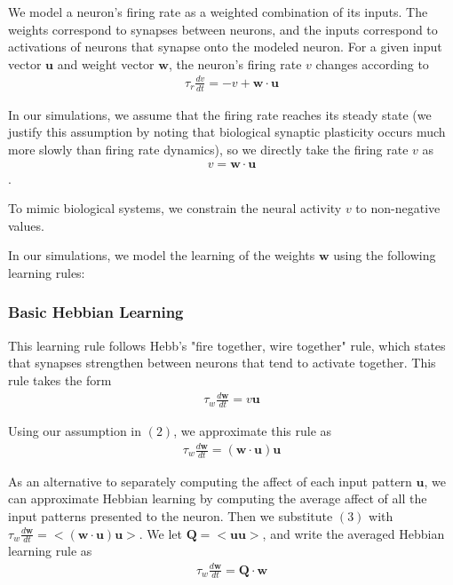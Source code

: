 \documentclass[pageno]{mat323paper}
\begin{document}
We model a neuron's firing rate as a weighted combination of its inputs. The weights correspond to synapses between neurons, and the inputs correspond to activations of neurons that synapse onto the modeled neuron. For a given input vector $\mathbf{u}$ and weight vector $\mathbf{w}$, the neuron's firing rate $v$ changes according to
\begin{align}
\tau_r\frac{dv}{dt}=-v+\mathbf{w}\cdot\mathbf{u}
\end{align}

In our simulations, we assume that the firing rate reaches its steady state (we justify this assumption by noting that biological synaptic plasticity occurs much more slowly than firing rate dynamics), so we directly take the firing rate $v$ as 
\begin{align}
v=\mathbf{w}\cdot\mathbf{u}
\end{align}.

To mimic biological systems, we constrain the neural activity $v$ to non-negative values.

In our simulations, we model the learning of the weights $\mathbf{w}$ using the following learning rules:

\subsubsection{Basic Hebbian Learning}
This learning rule follows Hebb's "fire together, wire together" rule, which states that synapses strengthen between neurons that tend to activate together. This rule takes the form
\begin{align}
\tau_w\frac{d\mathbf{w}}{dt}=v\mathbf{u}
\end{align}

Using our assumption in $(2)$, we approximate this rule as
\begin{align}
\tau_w\frac{d\mathbf{w}}{dt}=(\mathbf{w}\cdot\mathbf{u})\mathbf{u}
\end{align}

As an alternative to separately computing the affect of each input pattern $\mathbf{u}$, we can approximate Hebbian learning by computing the average affect of all the input patterns presented to the neuron. Then we substitute $(3)$ with $\tau_w\frac{d\mathbf{w}}{dt}=<(\mathbf{w}\cdot\mathbf{u})\mathbf{u}>$. We let $\mathbf{Q}=<\mathbf{u}\mathbf{u}>$, and write the averaged Hebbian learning rule as
\begin{align}
\tau_w\frac{d\mathbf{w}}{dt}=\mathbf{Q}\cdot\mathbf{w}
\end{align}
\end{document}
